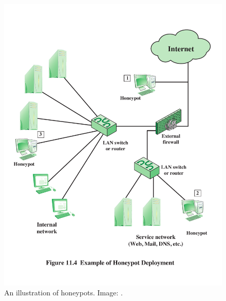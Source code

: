 \documentclass{beamer}
\begin{document}
\begin{frame}{\insertsubsectionhead}
  \begin{figure}
    \includegraphics[height=0.7\textheight]{honeypot.pdf}
    \caption{An illustration of honeypots.
      Image: \cite{Stallings2013nse}.}
  \end{figure}
\end{frame}
\end{document}
